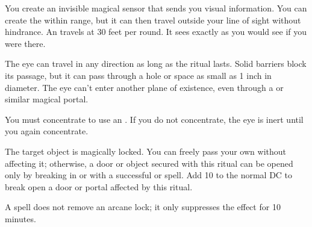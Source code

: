 \begin{spelleffect}
You create an invisible magical sensor that sends you visual information. You can create the  within \rngmed range, but it can then travel outside your line of sight without hindrance. An  travels at 30 feet per round. It sees exactly as you would see if you were there.
\par The eye can travel in any direction as long as the ritual lasts. Solid barriers block its passage, but it can pass through a hole or space as small as 1 inch in diameter. The eye can't enter another plane of existence, even through a  or similar magical portal.
\par You must concentrate to use an . If you do not concentrate, the eye is inert until you again concentrate.
\end{spelleffect}

\begin{spelleffect}
The target object is magically locked. You can freely pass your own  without affecting it; otherwise, a door or object secured with this ritual can be opened only by breaking in or with a successful  or  spell. Add 10 to the normal DC to break open a door or portal affected by this ritual.
\end{spelleffect}
\begin{spellnotes}
A  spell does not remove an arcane lock; it only suppresses the effect for 10 minutes.
\end{spellnotes}

